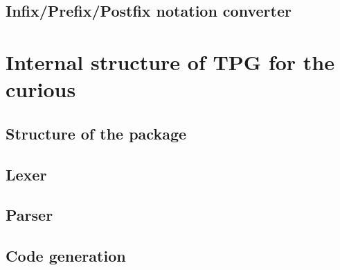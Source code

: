 \documentclass[a4paper,twoside]{report}
\begin{document}
	\chapter{Infix/Prefix/Postfix notation converter}
		

\cleardoublepage
\part{Internal structure of TPG for the curious}
\label{tpg:hack}
	\chapter{Structure of the package}
		
	\chapter{Lexer}
		
	\chapter{Parser}
		
	\chapter{Code generation}
		
\end{document}
